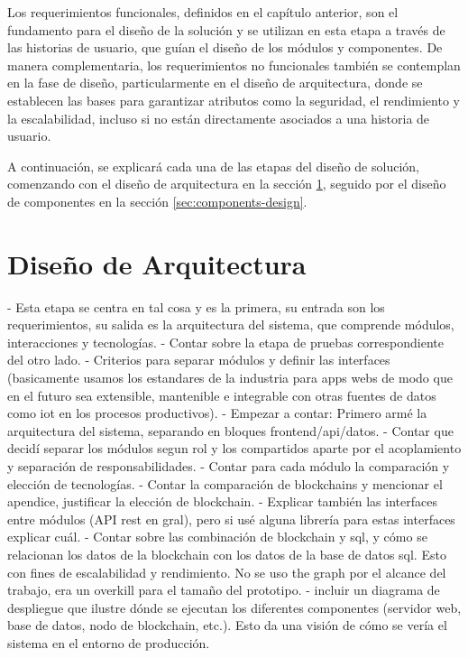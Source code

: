 Los requerimientos funcionales, definidos en el capítulo anterior, son el fundamento para el diseño de la solución y se utilizan en esta etapa a través de las historias de usuario, que guían el diseño de los módulos y componentes. De manera complementaria, los requerimientos no funcionales también se contemplan en la fase de diseño, particularmente en el diseño de arquitectura, donde se establecen las bases para garantizar atributos como la seguridad, el rendimiento y la escalabilidad, incluso si no están directamente asociados a una historia de usuario.

A continuación, se explicará cada una de las etapas del diseño de solución, comenzando con el diseño de arquitectura en la sección \ref{sec:module-design}, seguido por el diseño de componentes en la sección \ref{sec:components-design}.

\section{Diseño de Arquitectura}
\label{sec:module-design}

- Esta etapa se centra en tal cosa y es la primera, su entrada son los requerimientos, su salida es la arquitectura del sistema, que comprende módulos, interacciones y tecnologías.
- Contar sobre la etapa de pruebas correspondiente del otro lado.
- Criterios para separar módulos y definir las interfaces (basicamente usamos los estandares de la industria para apps webs de modo que en el futuro sea extensible, mantenible e integrable con otras fuentes de datos como iot en los procesos productivos).
- Empezar a contar: Primero armé la arquitectura del sistema, separando en bloques frontend/api/datos. 
- Contar que decidí separar los módulos segun rol y los compartidos aparte por el acoplamiento y separación de responsabilidades.
- Contar para cada módulo la comparación y elección de tecnologías. 
- Contar la comparación de blockchains y mencionar el apendice, justificar la elección de blockchain.
- Explicar también las interfaces entre módulos (API rest en gral), pero si usé alguna librería para estas interfaces explicar cuál.
- Contar sobre las combinación de blockchain y sql, y cómo se relacionan los datos de la blockchain con los datos de la base de datos sql. Esto con fines de escalabilidad y rendimiento. No se uso the graph por el alcance del trabajo, era un overkill para el tamaño del prototipo.
- incluir un diagrama de despliegue que ilustre dónde se ejecutan los diferentes componentes (servidor web, base de datos, nodo de blockchain, etc.). Esto da una visión de cómo se vería el sistema en el entorno de producción.

